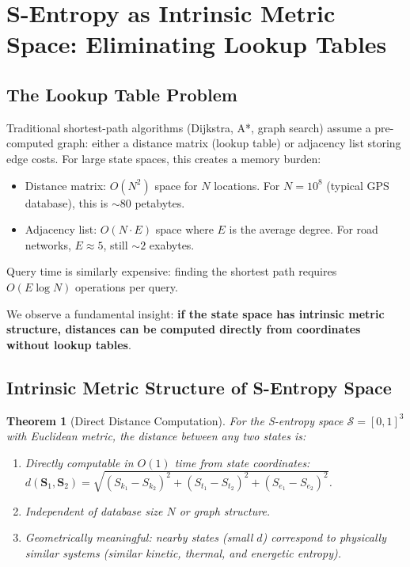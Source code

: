 \documentclass[twocolumn,11pt,a4paper]{article}
\newtheorem{theorem}{Theorem}[section]
\newcommand{\Sk}{S_{k}}
\newcommand{\St}{S_{t}}
\newcommand{\Se}{S_{e}}
\newcommand{\Stuple}{\mathbf{S}}
\newcommand{\calS}{\mathcal{S}}
\begin{document}
\section{S-Entropy as Intrinsic Metric Space: Eliminating Lookup Tables}
\label{sec:intrinsic_metric}

\subsection{The Lookup Table Problem}

Traditional shortest-path algorithms (Dijkstra, A*, graph search) assume a pre-computed graph: either a distance matrix (lookup table) or adjacency list storing edge costs. For large state spaces, this creates a memory burden:

\begin{itemize}[nosep,leftmargin=1em]
  \item Distance matrix: $O(N^2)$ space for $N$ locations. For $N=10^8$ (typical GPS database), this is $\sim 80$ petabytes.
  \item Adjacency list: $O(N \cdot E)$ space where $E$ is the average degree. For road networks, $E \approx 5$, still $\sim 2$ exabytes.
\end{itemize}

Query time is similarly expensive: finding the shortest path requires $O(E \log N)$ operations per query.

We observe a fundamental insight: \textbf{if the state space has intrinsic metric structure, distances can be computed directly from coordinates without lookup tables}.

\subsection{Intrinsic Metric Structure of S-Entropy Space}

\begin{theorem}[Direct Distance Computation]
\label{thm:intrinsic_metric}
For the S-entropy space $\calS = [0,1]^3$ with Euclidean metric, the distance between any two states is:
\begin{enumerate}[nosep,label=(\roman*)]
  \item Directly computable in $O(1)$ time from state coordinates: $d(\Stuple_1, \Stuple_2) = \sqrt{(\Sk_1-\Sk_2)^2 + (\St_1-\St_2)^2 + (\Se_1-\Se_2)^2}$.
  \item Independent of database size $N$ or graph structure.
  \item Geometrically meaningful: nearby states (small $d$) correspond to physically similar systems (similar kinetic, thermal, and energetic entropy).
\end{enumerate}
\end{theorem}
\end{document}
